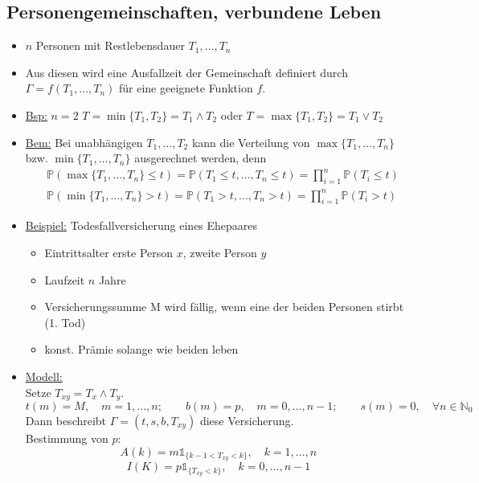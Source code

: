 \subsection{Personengemeinschaften, verbundene Leben}
\label{sub:verbundene_leben}
\begin{itemize}
	\item $n$ Personen mit Restlebensdauer $T_1,\dots,T_n$
	\item Aus diesen wird eine Ausfallzeit der Gemeinschaft definiert durch $\Gamma=f(T_1,\dots,T_n)$ für eine geeignete Funktion $f$.
	\item \uline{Bsp:} $n=2$ $T=\min\{T_1,T_2\}=T_1\land T_2$ oder $T=\max\{T_1,T_2\}=T_1\lor T_2$
	\item \uline{Bem:} Bei unabhängigen $T_1,\dots,T_2$ kann die Verteilung von $\max\{T_1,\dots,T_n\}$ bzw. $\min\{T_1,\dots,T_n\}$ ausgerechnet werden, denn
	\begin{equation*}
	\begin{aligned}
		&\mathds{P}(\max\{T_1,\dots,T_n\}\le t)=\mathds{P}(T_1\le t,\dots,T_n\le t)=\prod_{i=1}^{n}\mathds{P}(T_i\le t)\\
		&\mathds{P}(\min\{T_1,\dots,T_n\}>t)=\mathds{P}(T_1>t,\dots,T_n>t)=\prod_{i=1}^{n}\mathds{P}(T_i>t)
	\end{aligned}
	\end{equation*}
	\item \uline{Beispiel:} Todesfallversicherung eines Ehepaares
	\begin{itemize}
		\item Eintrittsalter erste Person $x$, zweite Person $y$
		\item Laufzeit $n$ Jahre
		\item Versicherungssumme M wird fällig, wenn eine der beiden Personen stirbt (1. Tod)
		\item konst. Prämie solange wie beiden leben
	\end{itemize}
	\item \uline{Modell:}\\
	Setze $T_{xy}=T_x\land T_y$.\\
	$t(m)=M,\quad m=1,\dots,n;\qquad b(m)=p, \quad m=0,\dots,n-1;\qquad s(m)=0,\quad \forall n\in \mathds{N}_0$\\
	Dann beschreibt $\Gamma=(t,s,b,T_{xy})$ diese Versicherung.\\
	Bestimmung von $p$:\\
	\[
	A(k)=m\mathbb{1}_{\{k-1<T_{xy}<k\}}, \quad k=1,\dots,n
	\]
	\[
	I(K)=p\mathbb{1}_{\{T_{xy}<k\}}, \quad k=0,\dots,n-1
\]
\end{itemize}
